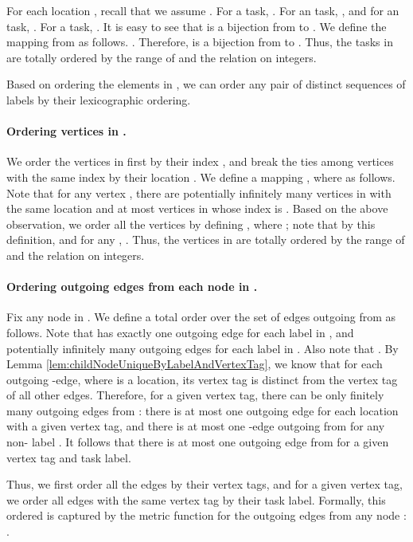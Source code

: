 \documentclass[11pt]{article}
\numberwithin{theorem}{section}
\begin{document}
For each location , recall that we assume . For a  task, . For an  task, , and for an  task, .
For a  task, . It is easy to see that  is a bijection from  to . 
We define the mapping from  as follows. . Therefore,  is a bijection from  to .
Thus, the tasks in  are totally ordered by the range of  and the  relation on integers.



Based on ordering the elements in , we can order any pair of distinct sequences of labels by their lexicographic ordering.

\paragraph{Ordering vertices in .}
We order the vertices  in  first by their index , and break the ties among vertices with the same index by their location .
We define a mapping , where  as follows. Note that for any vertex , there are potentially infinitely many vertices in  with the same location  and at most  vertices in  whose index is . Based on the above observation, we order all the vertices  by defining , where ; note that by this definition,  and for any , . Thus, the vertices in  are totally ordered by the range of  and the  relation on integers.

\paragraph{Ordering outgoing edges from each node in .}
Fix any node  in . We define a total order over the set of edges outgoing from  as follows. Note that  has exactly one outgoing edge for each label in , and potentially infinitely many outgoing edges for each label in . Also note that . By Lemma \ref{lem:childNodeUniqueByLabelAndVertexTag}, we know that for each outgoing -edge, where  is a location, its vertex tag is distinct from the vertex tag of all other   edges. Therefore, for a given vertex tag, there can be only finitely many outgoing edges from : there is at most one outgoing  edge for each location  with a given vertex tag, and there is at most one -edge outgoing from  for any non- label . It follows that there is at most one outgoing edge from  for a given vertex tag and task label.

Thus, we first order all the edges by their vertex tags, and for a given vertex tag, we order all edges with the same vertex tag by their task label. Formally, this ordered is captured by the metric function  for the outgoing edges  from any node : . 
\end{document}
